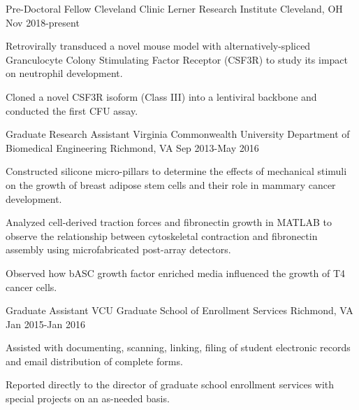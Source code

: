 

\begin{cventries}

  \cventry
    {Pre-Doctoral Fellow} %
    {Cleveland Clinic Lerner Research Institute} %
    {Cleveland, OH} %
    {Nov 2018-present} %
    {
      \begin{cvitems} %
        \item {Retrovirally transduced a novel mouse model with alternatively-spliced Granculocyte Colony Stimulating Factor Receptor (CSF3R) to study its impact on neutrophil development.}
        \item {Cloned a novel CSF3R isoform (Class III) into a lentiviral backbone and conducted the first CFU assay.} 
      \end{cvitems}
    }

    \cventry
    {Graduate Research Assistant} %
    {Virginia Commonwealth University Department of Biomedical Engineering} %
    {Richmond, VA} %
    {Sep 2013-May 2016} %
    {
      \begin{cvitems} %
        \item {Constructed silicone micro-pillars to determine the effects of mechanical stimuli on the growth of breast adipose stem cells and their role in mammary cancer development.}
        \item {Analyzed cell-derived traction forces and fibronectin growth in MATLAB to observe the relationship between cytoskeletal contraction and fibronectin assembly using microfabricated post-array detectors.}
        \item {Observed how bASC growth factor enriched  media influenced the growth of T4 cancer cells.} 
      \end{cvitems}
    }

    \cventry
    {Graduate Assistant} %
    {VCU Graduate School of Enrollment Services} %
    {Richmond, VA} %
    {Jan 2015-Jan 2016} %
    {
      \begin{cvitems} %
        \item {Assisted with documenting, scanning, linking, filing of student electronic records and email distribution of complete forms.}
        \item {Reported directly to the director of graduate school enrollment services with special projects on an as-needed basis.}
      \end{cvitems}
    }


\end{cventries}
